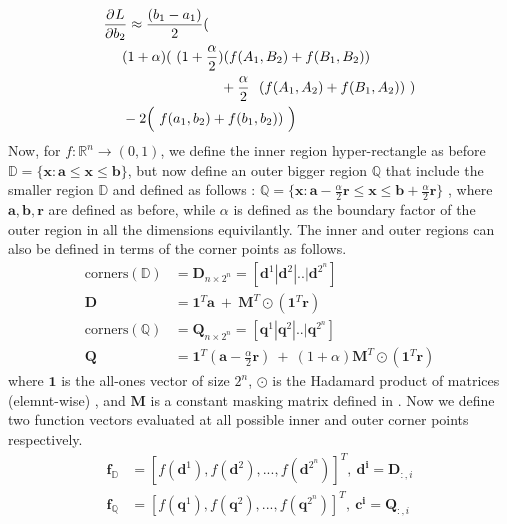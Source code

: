 \begin{equation}
\begin{aligned} 
&\frac{\partial^{} L}{\partial b_{2}} \approx \frac{(b_{1}-a_{1})}{2}( \\
&~~~~(1+ \alpha )(~(1+ \frac \alpha2 )(f(A_{1},B_{2}) + f(B_{1},B_{2}))\\ &~~~~~~~~~~~~~~~~~~~~~~~~~ +\frac \alpha2 ~~(f(A_{1},A_{2}) + f(B_{1},A_{2}))~)\\
&~~~~- 2\Big(~f(a_{1},b_{2}) + f(b_{1},b_{2}))~\Big)
\label{eq:update-outer-2-4}
\end{aligned}
\end{equation}
Now, for $f: \mathbb{R}^{n} \rightarrow (0,1)$, we define the inner region hyper-rectangle as before $\mathbb{D} = \{\mathbf{x}: \mathbf{a} \leq \mathbf{x} \leq \mathbf{b}\}$, but now define an outer bigger region $\mathbb{Q}$ that include the smaller region $\mathbb{D} $ and defined as follows : $\mathbb{Q} = \{\mathbf{x}: \mathbf{a} - \frac{\alpha}{2}\mathbf{r} \leq \mathbf{x} \leq \mathbf{b} + \frac{\alpha}{2}\mathbf{r} \}$ , where $\mathbf{a},\mathbf{b},\mathbf{r}$ are defined as before, while $\alpha$ is defined as the boundary factor of the outer region in all the dimensions equivilantly. The inner and outer regions can also be defined in terms of the corner points as follows.
\begin{equation}
\begin{aligned} 
\text{corners}(\mathbb{D}) &= \mathbf{D}_{n\times 2^{n}} = \left[\mathbf{d}^{1} | \mathbf{d}^{2} |.. | \mathbf{d}^{2^{n}}\right] \\
\mathbf{D} &= \mathbf{1}^{T}\mathbf{a}~ +~ \mathbf{M}^{T} \odot (\mathbf{1}^{T}\mathbf{r}) \\
\text{corners}(\mathbb{Q}) &= \mathbf{Q}_{n\times 2^{n}} = \left[\mathbf{q}^{1} | \mathbf{q}^{2} |.. | \mathbf{q}^{2^{n}}\right] \\
\mathbf{Q} &= \mathbf{1}^{T}(\mathbf{a} - \frac{\alpha}{2}\mathbf{r})~ +~ (1+\alpha)\mathbf{M}^{T} \odot (\mathbf{1}^{T}\mathbf{r}) 
\label{eq:n-corners2-sup}
\end{aligned}
\end{equation}
where $\mathbf{1}$ is the all-ones vector of size $2^{n}$, $\odot$ is the Hadamard product of matrices (elemnt-wise) , and $\mathbf{M}$ is a constant  masking matrix defined in \eqLabel{\ref{eq:n-mask-sup}}. Now we define two function vectors evaluated at all possible inner and outer corner points respectively.
\begin{equation}
\begin{aligned} 
\mathbf{f}_{\mathbb{D}} &= \left[f(\mathbf{d}^{1}), f(\mathbf{d}^{2}),...,f(\mathbf{d}^{2^{n}}) \right]^{T} , ~ \mathbf{d^{i}} = \mathbf{D}_{:,i}\\
\mathbf{f}_{\mathbb{Q}} &= \left[f(\mathbf{q}^{1}), f(\mathbf{q}^{2}),...,f(\mathbf{q}^{2^{n}}) \right]^{T} , ~ \mathbf{c^{i}} = \mathbf{Q}_{:,i}
\label{eq:n-function-outer-sup}
\end{aligned}
\end{equation}
